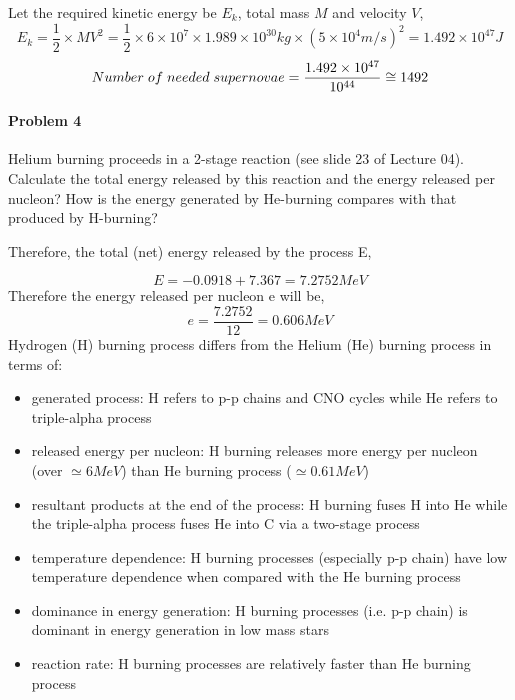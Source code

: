 \documentclass[11pt]{scrartcl}
\begin{document}
{\newline Let the required kinetic energy be $E_k$, total mass $M$ and velocity $V$,
\begin{equation}
    E_k = \frac{1}{2}\times MV^2 =\frac{1}{2}\times 6 \times 10^7 \times 1.989 \times 10^{30} kg \times (5 \times 10^4 m/s)^2 = 1.492 \times 10^{47} J
\end{equation}
\begin{equation}
    Number \hspace{1mm}of\hspace{1mm} needed\hspace{1mm} supernovae = \frac{1.492 \times 10^{47}}{10^{44}} \cong 1492
\end{equation}

\paragraph*{Problem 4}
Helium burning proceeds in a 2-stage reaction (see slide 23 of Lecture 04). Calculate the total energy released by this reaction and the energy released per nucleon? How is the energy generated by He-burning compares with that
produced by H-burning?

\makebox[\textwidth]{}

Therefore, the total (net) energy released by the process E,

\begin{equation}
    E = -0.0918 + 7.367 = 7.2752 MeV
\end{equation}
Therefore the energy released per nucleon e will be,
\begin{equation}
    e = \frac{7.2752}{12} = 0.606 MeV
\end{equation}
\newpage
Hydrogen (H) burning process differs from the Helium (He) burning process in terms of:
\begin{itemize}[noitemsep,nolistsep]
    \item  generated process: H refers to p-p chains and CNO cycles while He refers to triple-alpha process
    \item released energy per nucleon: H burning releases more energy per nucleon (over $\simeq 6MeV$) than He burning process ($\simeq 0.61MeV$)
    \item resultant products at the end of the process: H burning fuses H into He while the triple-alpha process fuses He into C via a two-stage process
    \item temperature dependence: H burning processes (especially p-p chain) have low temperature dependence when compared with the He burning process
    \item dominance in energy generation: H burning processes (i.e. p-p chain) is dominant in energy generation in low mass stars
    \item reaction rate: H burning processes are relatively faster than He burning process
\end{itemize}

}
\end{document}
